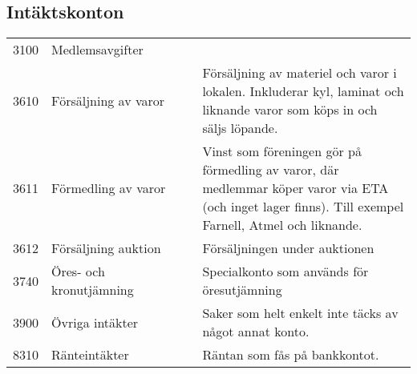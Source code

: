 		\begin{adjustwidth}{-8em}{}
			\section{Intäktskonton}
			\label{sec:kontoplan:intäkt}
			\begin{xtabular}[l]{l p{0.4\linewidth} p{0.6\linewidth}}
				3100 & Medlemsavgifter &  \\
				3610 & Försäljning av varor & Försäljning av materiel och varor i lokalen. Inkluderar kyl, laminat och liknande varor som köps in och säljs löpande. \\
				3611 & Förmedling av varor & Vinst som föreningen gör på förmedling av varor, där medlemmar köper varor via ETA (och inget lager finns). Till exempel Farnell, Atmel och liknande. \\
				3612 & Försäljning auktion & Försäljningen under auktionen \\
				3740 & Öres- och kronutjämning & Specialkonto som används för öresutjämning \\
				3900 & Övriga intäkter & Saker som helt enkelt inte täcks av något annat konto. \\
				8310 & Ränteintäkter & Räntan som fås på bankkontot. \\
				
			\end{xtabular}
		\end{adjustwidth}
		
